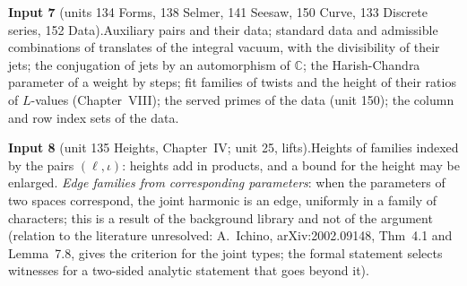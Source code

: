 \documentclass[11pt,a4paper]{article}
\theoremstyle{plainx}
\theoremstyle{uprightx}
\newcommand{\CC}{\mathbb{C}}
\begin{document}
{\vspace{3pt}\textbf{Input 7} (units 134 Forms, 138 Selmer, 141 Seesaw, 150 Curve, 133 Discrete series, 152
Data).\enspace Auxiliary pairs and their data; standard data and admissible combinations of translates of the
integral vacuum, with the divisibility of their jets; the conjugation of jets by an automorphism of $\CC$; the
Harish-Chandra parameter of a weight by steps; fit families of twists and the height of their ratios of
$L$-values (Chapter~VIII); the served primes of the data (unit 150); the column and row index sets of the data.

\vspace{3pt}\textbf{Input 8} (unit 135 Heights, Chapter~IV; unit 25, lifts).\enspace Heights of families indexed
by the pairs $(\ell,\iota)$: heights add in products, and a bound for the height may be enlarged. \emph{Edge
families from corresponding parameters}: when the parameters of two spaces correspond, the joint harmonic is an
edge, uniformly in a family of characters; this is a result of the background library and not of the argument
(relation to the literature unresolved: A.~Ichino, arXiv:2002.09148, Thm~4.1 and Lemma~7.8, gives the criterion
for the joint types; the formal statement selects witnesses for a two-sided analytic statement that goes beyond
it).}
\end{document}
